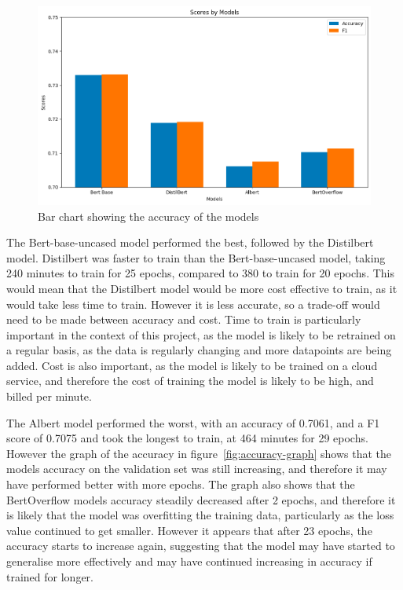 \documentclass{UoYCSproject}
\begin{document}
\begin{figure}[h]
    \centering

        \includegraphics[width=12cm]{./figures/model-accuracy}
        \caption{Bar chart showing the accuracy of the models}
        \label{fig:accuracy}
    \end{figure}

    The Bert-base-uncased model performed the best, followed by the Distilbert model.
    Distilbert was faster to train than the Bert-base-uncased model, taking 240 minutes to train for 25 epochs, compared to 380 to train for 20 epochs.
    This would mean that the Distilbert model would be more cost effective to train, as it would take less time to train.
    However it is less accurate, so a trade-off would need to be made between accuracy and cost.
    Time to train is particularly important in the context of this project, as the model is likely to be retrained on a regular basis, as the data is regularly changing and more datapoints are being added.
    Cost is also important, as the model is likely to be trained on a cloud service, and therefore the cost of training the model is likely to be high, and billed per minute.

    The Albert model performed the worst, with an accuracy of 0.7061, and a F1 score of 0.7075 and took the longest to train, at 464 minutes for 29 epochs.
    However the graph of the accuracy in figure~\ref{fig:accuracy-graph} shows that the models accuracy on the validation set was still increasing, and therefore it may have performed better with more epochs.
    The graph also shows that the BertOverflow models accuracy steadily decreased after 2 epochs, and therefore it is likely that the model was overfitting the training data, particularly as the loss value continued to get smaller.
    However it appears that after 23 epochs, the accuracy starts to increase again, suggesting that the model may have started to generalise more effectively and may have continued increasing in accuracy if trained for longer.
     \par
\end{document}
